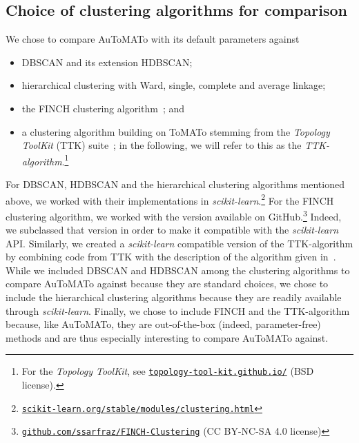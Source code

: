 \documentclass[10pt]{article} %
\theoremstyle{plain}
\newcommand{\aut}{AuToMATo\xspace}
\newcommand{\tom}{ToMATo\xspace}
\begin{document}
\subsection{Choice of clustering algorithms for comparison}\label{subsec:choice_of_algs_for_comparison}
We chose to compare \aut with its default parameters against
\begin{itemize}[nolistsep]
    \item DBSCAN and its extension HDBSCAN;
    \item hierarchical clustering with Ward, single, complete and average linkage;
    \item the FINCH clustering algorithm~\citep{sarfraz2019efficient}; and
    \item a clustering algorithm building on \tom stemming from the \emph{Topology ToolKit} (TTK) suite~\citep{topology_toolkit}; in the following, we will refer to this as the \emph{TTK-algorithm}.\footnote{For the \emph{Topology ToolKit}, see \href{https://topology-tool-kit.github.io/}{\nolinkurl{topology-tool-kit.github.io/}} (BSD license).}
\end{itemize}
For DBSCAN, HDBSCAN and the hierarchical clustering algorithms mentioned above, we worked with their implementations in \emph{scikit-learn}.\footnote{\href{https://scikit-learn.org/stable/modules/clustering.html}{\nolinkurl{scikit-learn.org/stable/modules/clustering.html}}} For the FINCH clustering algorithm, we worked with the version available on GitHub.\footnote{\href{https://github.com/ssarfraz/FINCH-Clustering}{\nolinkurl{github.com/ssarfraz/FINCH-Clustering}} (CC BY-NC-SA 4.0 license)} Indeed, we subclassed that version in order to make it compatible with the \emph{scikit-learn} API. Similarly, we created a \emph{scikit-learn} compatible version of the TTK-algorithm by combining code from TTK with the description of the algorithm given in~\citet[Section 5.2]{cotsakis2021implementing}. While we included DBSCAN and HDBSCAN among the clustering algorithms to compare \aut against because they are standard choices, we chose to include the hierarchical clustering algorithms because they are readily available through \emph{scikit-learn}. Finally, we chose to include FINCH and the TTK-algorithm because, like \aut, they are out-of-the-box (indeed, parameter-free) methods and are thus especially interesting to compare \aut against.
\end{document}
